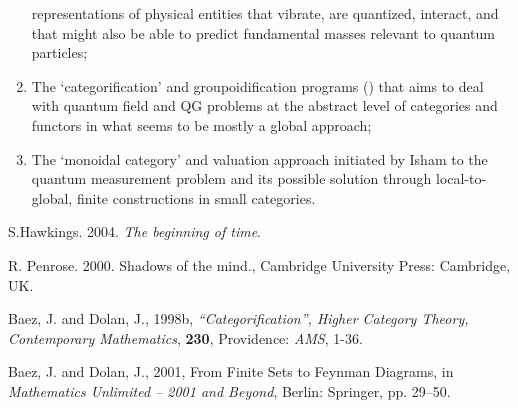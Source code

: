 \documentclass[12pt]{article}
\theoremstyle{plain}
\theoremstyle{definition}
\numberwithin{equation}{section}
\begin{document}
\begin{enumerate}
representations of physical entities that vibrate, are quantized, interact, and that might also be able to predict fundamental masses relevant to quantum particles; 
\item The `categorification' and groupoidification programs (\cite{BAJ-DJ98b,BAJ-DJ2k1}) that aims to deal with quantum field and QG problems at the abstract level of categories and functors in what seems to be mostly a global approach; 
\item The `monoidal category' and valuation approach initiated by Isham to the quantum measurement problem and its possible solution through local-to-global, finite constructions in small categories. 
\end{enumerate}

\begin{thebibliography}{9}

S.Hawkings. 2004. \emph{The beginning of time}. 

R. Penrose. 2000. {Shadows of the mind.}, Cambridge University Press: Cambridge, UK.

Baez, J. and Dolan, J., 1998b, \emph{``Categorification'', Higher Category Theory, Contemporary Mathematics}, 
\textbf{230}, Providence: \emph{AMS}, 1-36. 

Baez, J. and Dolan, J., 2001, From Finite Sets to Feynman Diagrams, in \emph{Mathematics Unlimited -- 2001 and Beyond}, Berlin: Springer, pp. 29--50. 


\end{thebibliography}

\end{document}
